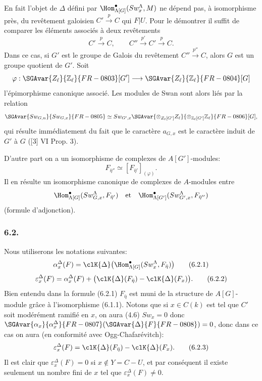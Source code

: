 En fait l'objet de $\Delta$ défini par $\Hom^\bullet_{\Lambda[G]}(Sw_x^\Lambda,M)$ ne dépend pas, à isomorphisme près, du revêtement galoisien $C'\xrightarrow{p}C$ qui  $F|U$. Pour le démontrer il suffit de comparer les éléments associés à deux revêtements
\[
C'\xrightarrow{p}C,\qquad C''\xrightarrow{p'}C'\xrightarrow{p}C.
\]
Dans ce cas, si $G'$ est le groupe de Galois du revêtement $C''\xrightarrow{p''}C$, alors $G$ est un groupe quotient de $G'$. Soit
\[
\varphi:\SGAvar{Z_\ell}{\mathbb{Z}_\ell}{FR-0803}[G']\longrightarrow \SGAvar{Z_\ell}{\mathbb{Z}_\ell}{FR-0804}[G]
\]
l'épimorphisme canonique associé. Les modules de Swan sont alors liés par la relation
\[
\SGAvar{Sw_{G,n}}{Sw_{G,x}}{FR-0805}\simeq Sw_{G',x}\SGAvar{\otimes_{Z_\ell[G']}Z_\ell}{\otimes_{\mathbb{Z}_\ell[G']}\mathbb{Z}_\ell}{FR-0806}[G],
\]
qui résulte immédiatement du
fait que le caractère $a_{G,x}$ est le caractère induit de $G'$ à $G$ ([3] VI Prop. 3).

D'autre part on a un isomorphisme de complexes de $A[G']$-modules:
\[
F_{\bar\eta''}\simeq [F_{\bar\eta'}]_{(\varphi)}.
\]
Il en résulte un isomorphisme canonique de complexes de $A$-modules entre
\[
\Hom^\bullet_{\Lambda[G]}(Sw_{G,x}^\Lambda,F_{\bar\eta'})
\quad\text{et}\quad
\Hom^\bullet_{\Lambda[G']}(Sw_{G',x}^\Lambda,F_{\bar\eta''})
\]
(formule d'adjonction).

\subsubsection*{6.2.}

Nous utiliserons les notations suivantes:
\[
\alpha_x^\Delta(F)
=
\clK{\Delta}\bigl(\Hom^\bullet_{\Lambda[G]}(Sw_x^\Lambda,F_{\bar\eta})\bigr)
\tag{6.2.1}
\]
\[
\varepsilon_x^\Delta(F)
=
\alpha_x^\Delta(F)+
\bigl(\clK{\Delta}(F_{\bar\eta})-\clK{\Delta}(F_x)\bigr).
\tag{6.2.2}
\]
Bien entendu dans la formule (6.2.1) $F_{\bar\eta}$ est muni de la structure de $A[G]$-module grâce à l'isomorphisme (6.1.1). Notons que si $x\in C(k)$ est tel que $C'$ soit modérément ramifié en $x$, on aura (4.6) $Sw_x=0$ donc $\SGAvar{\alpha_x}{\alpha_x^\Delta}{FR-0807}(\SGAvar{\Delta}{F}{FR-0808})=0$, donc dans ce cas on aura (en conformité avec Ogg-Chafarévitch):
\[
\varepsilon_x^\Delta(F)=\clK{\Delta}(F_{\bar\eta})-\clK{\Delta}(F_x).
\tag{6.2.3}
\]
Il est clair que $\varepsilon_x^\Delta(F)=0$ si $x\notin Y=C-U$, et par conséquent il existe seulement un nombre fini de $x$ tel que $\varepsilon_x^\Delta(F)\ne0$.

